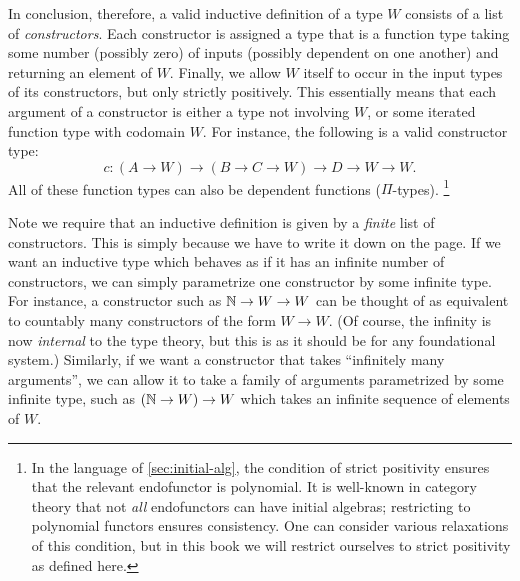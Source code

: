%
In conclusion, therefore, a valid inductive definition of a type $W$ consists of a list of \emph{constructors}.
Each constructor is assigned a type that is a function type taking some number (possibly zero) of inputs (possibly dependent on one another) and returning an element of $W$.
Finally, we allow $W$ itself to occur in the input types of its constructors, but only strictly positively.
This essentially means that each argument of a constructor is either a type not involving $W$, or some iterated function type with codomain $W$.
For instance, the following is a valid constructor type:
\begin{equation}
  c:(A\to W) \to (B\to C \to W) \to D \to W \to W.\label{eq:example-constructor}
\end{equation}
All of these function types can also be dependent functions ($\Pi$-types).%
\footnote{In the language of \cref{sec:initial-alg}, the condition of strict positivity ensures that the relevant endofunctor is polynomial. It is well-known in category theory that not \emph{all} endofunctors can have initial algebras; restricting to polynomial functors ensures consistency.
One can consider various relaxations of this condition, but in this book we will restrict ourselves to strict positivity as defined here.}

Note we require that an inductive definition is given by a \emph{finite} list of constructors.
This is simply because we have to write it down on the page.
If we want an inductive type which behaves as if it has an infinite number of constructors, we can simply parametrize one constructor by some infinite type.
For instance, a constructor such as $\mathbb{N} \to W \to W$ can be thought of as equivalent to countably many constructors of the form $W\to W$.
(Of course, the infinity is now \emph{internal} to the type theory, but this is as it should be for any foundational system.)
Similarly, if we want a constructor that takes ``infinitely many arguments'', we can allow it to take a family of arguments parametrized by some infinite type, such as $(\mathbb{N}\to W) \to W$ which takes an infinite sequence of elements of $W$.

